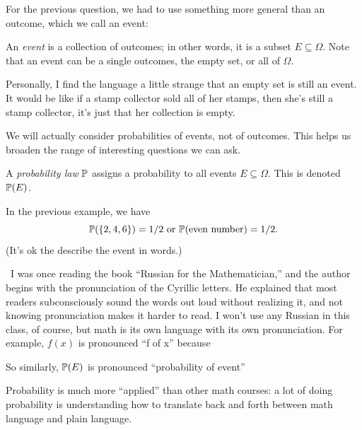 \documentclass{ximera}
\begin{document}
For the previous question, we had to use something more general than an outcome, which we call an event:

\begin{definition}
An \textit{event} is a collection of outcomes; in other words, it is a subset $E\subseteq \Omega$. Note that an event can be a single outcomes, the empty set, or all of $\Omega$.
\end{definition}
Personally, I find the language a little strange that an empty set is still an event. It would be like if a stamp collector sold all of her stamps, then she's still a stamp collector, it's just that her collection is empty.

We will actually consider probabilities of events, not of outcomes. This helps us broaden the range of interesting questions we can ask.

\begin{definition}
A \textit{probability law} $\mathbb{P}$ assigns a probability to all events $E\subseteq \Omega$. This is denoted $\mathbb{P}(E)$. 
\end{definition}

In the previous example, we have
$$
\mathbb{P}(\{2,4,6\}) = 1/2 \text{ or } \mathbb{P}(\text{even number})=1/2.
$$
(It's ok the describe the event in words.)

\Lightning \Lightning \ I was once reading the book ``Russian for the Mathematician,'' and the author begins with the pronunciation of the Cyrillic letters. He explained that most readers subconsciously sound the words out loud without realizing it, and not knowing pronunciation makes it harder to read. I won't use any Russian in this class, of course, but math is its own language with its own pronunciation. For example, $f(x)$ is pronounced ``f of x'' because

\begin{center}
\end{center}
So similarly, $\mathbb{P}(E)$ is pronounced ``probability of event''
\begin{center}
\end{center}
Probability is much more ``applied'' than other math courses: a lot of doing probability is understanding how to translate back and forth between math language and plain language.  \Lightning \Lightning 
\end{document}
